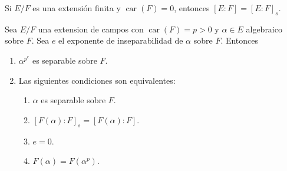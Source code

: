 \documentclass[12pt]{report}
\theoremstyle{largebreak}
\DeclareMathOperator{\car}{car}
\begin{document}
    \begin{obs}
        Si $E/F$ es una extensión finita y $\car(F)=0$, entonces $\left[E:F\right]=\left[E:F\right]_s$.
    \end{obs}

    \begin{propo}
        Sea $E/F$ una extension de campos con $\car(F)=p>0$ y $\alpha\in E$ algebraico sobre $F$. Sea $e$ el exponente de inseparabilidad de $\alpha$ sobre $F$. Entonces
        \begin{enumerate}
            \item $\alpha^{p^e}$ es separable sobre $F$.
            \item Las siguientes condiciones son equivalentes:
            \begin{enumerate}
                \item $\alpha$ es separable sobre $F$.
                \item $\left[F(\alpha):F\right]_s=\left[F(\alpha):F\right]$.
                \item $e=0$.
                \item $F(\alpha)=F(\alpha^p)$.
            \end{enumerate}
        \end{enumerate}
    \end{propo}
\end{document}
